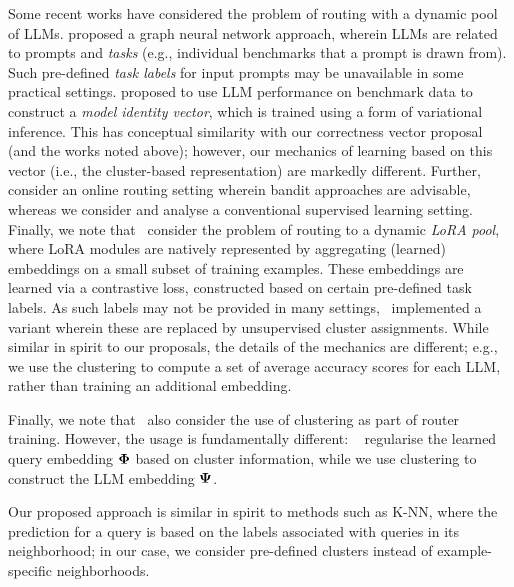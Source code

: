 Some recent works have considered the problem of routing with a dynamic pool of LLMs.
\citet{Feng:2024} proposed a graph neural network approach,
wherein LLMs are related to prompts and \emph{tasks} (e.g., individual benchmarks that a prompt is drawn from).
Such 
pre-defined \emph{task labels} for input prompts
may be unavailable in some practical settings.
\citet{Li:2025} proposed to use LLM performance on benchmark data to construct a \emph{model identity vector},
which is trained using a form of variational inference.
This has conceptual similarity with our correctness vector proposal (and the works noted above);
however, our mechanics of learning based on this vector 
(i.e., the cluster-based representation)
are markedly different.
Further,~\citet{Li:2025} consider an online routing setting wherein bandit approaches are advisable,
whereas we consider and analyse a conventional supervised learning setting.
Finally, we note that~\citet{Zhao:2024} consider the problem of routing to a dynamic \emph{LoRA pool}, where LoRA modules are natively represented by aggregating (learned) embeddings on a small subset of training examples.
These embeddings are learned via a contrastive loss,
constructed based on certain pre-defined task labels.
As such labels may not be provided in many settings,~\citet{Chen:2024} implemented a variant wherein these are replaced by unsupervised cluster assignments.
While similar in spirit to our proposals, the details of the mechanics are different; e.g., we use the clustering to compute a set of average accuracy scores for each LLM,
rather than training an additional embedding.

Finally, we note that~\citet{Chen:2024} also consider the use of clustering as part of router training.
However, the usage is fundamentally different:
~\citet{Chen:2024}
regularise the learned query embedding $\boldsymbol{\Phi}$
based on
cluster information,
while we use clustering to construct the LLM embedding $\boldsymbol{\Psi}$.

Our proposed approach is similar in spirit to methods such as  K-NN, where the prediction for a query is based on the labels associated with queries in its neighborhood; in our case, we consider pre-defined clusters instead of example-specific neighborhoods.

 



